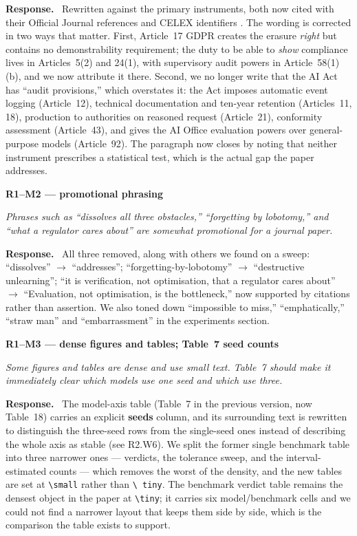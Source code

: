 \documentclass[11pt,a4paper]{article}
\newenvironment{point}[1]{%
  \par\medskip\noindent\textbf{\color{rcol}#1}\par\nopagebreak\smallskip\begingroup
  \color{rcol}\itshape}{\endgroup\par}
\newenvironment{reply}{%
  \par\smallskip\noindent\textbf{\color{acol}Response.}\ \begingroup}{\endgroup\par}
\begin{document}
\begin{reply}
Rewritten against the primary instruments, both now cited with their Official Journal
references and CELEX identifiers \citep{gdpr2016,aiact2024}. The wording is corrected in
two ways that matter. First, Article~17 GDPR creates the erasure \emph{right} but
contains no demonstrability requirement; the duty to be able to \emph{show} compliance
lives in Articles~5(2) and 24(1), with supervisory audit powers in Article~58(1)(b), and
we now attribute it there. Second, we no longer write that the AI Act has ``audit
provisions,'' which overstates it: the Act imposes automatic event logging
(Article~12), technical documentation and ten-year retention (Articles~11, 18),
production to authorities on reasoned request (Article~21), conformity assessment
(Article~43), and gives the AI Office evaluation powers over general-purpose models
(Article~92). The paragraph now closes by noting that neither instrument prescribes a
statistical test, which is the actual gap the paper addresses.
\end{reply}

\begin{point}{R1--M2 --- promotional phrasing}
Phrases such as ``dissolves all three obstacles,'' ``forgetting by lobotomy,'' and
``what a regulator cares about'' are somewhat promotional for a journal paper.
\end{point}

\begin{reply}
All three removed, along with others we found on a sweep: ``dissolves'' $\to$
``addresses''; ``forgetting-by-lobotomy'' $\to$ ``destructive unlearning''; ``it is
verification, not optimisation, that a regulator cares about'' $\to$ ``Evaluation, not
optimisation, is the bottleneck,'' now supported by citations rather than assertion.
We also toned down ``impossible to miss,'' ``emphatically,'' ``straw man'' and
``embarrassment'' in the experiments section.
\end{reply}

\begin{point}{R1--M3 --- dense figures and tables; Table~7 seed counts}
Some figures and tables are dense and use small text. Table~7 should make it
immediately clear which models use one seed and which use three.
\end{point}

\begin{reply}
The model-axis table (Table~7 in the previous version, now Table~18) carries an explicit \textbf{seeds} column, and its
surrounding text is rewritten to distinguish the three-seed rows from the single-seed
ones instead of describing the whole axis as stable (see R2.W6). We split the former
single benchmark table into three narrower ones --- verdicts, the tolerance sweep, and
the interval-estimated counts --- which removes the worst of the density, and the new
tables are set at \texttt{\textbackslash small} rather than \texttt{\textbackslash
tiny}. The benchmark verdict table remains the densest object in the paper at
\texttt{\textbackslash tiny}; it carries six model/benchmark cells and we could not find
a narrower layout that keeps them side by side, which is the comparison the table
exists to support.
\end{reply}
\end{document}

